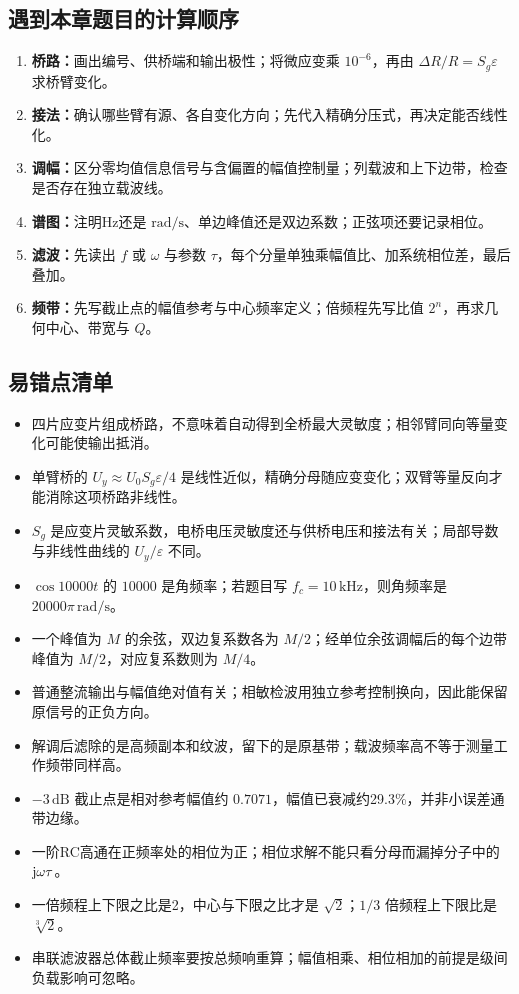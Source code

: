 \subsection*{遇到本章题目的计算顺序}
\begin{enumerate}
\setlength{\itemsep}{0pt}
\item \textbf{桥路：}画出编号、供桥端和输出极性；将微应变乘 $10^{-6}$，再由 $\Delta R/R=S_g\varepsilon$ 求桥臂变化。
\item \textbf{接法：}确认哪些臂有源、各自变化方向；先代入精确分压式，再决定能否线性化。
\item \textbf{调幅：}区分零均值信息信号与含偏置的幅值控制量；列载波和上下边带，检查是否存在独立载波线。
\item \textbf{谱图：}注明Hz还是 $\mathrm{rad/s}$、单边峰值还是双边系数；正弦项还要记录相位。
\item \textbf{滤波：}先读出 $f$ 或 $\omega$ 与参数 $\tau$，每个分量单独乘幅值比、加系统相位差，最后叠加。
\item \textbf{频带：}先写截止点的幅值参考与中心频率定义；倍频程先写比值 $2^n$，再求几何中心、带宽与 $Q$。
\end{enumerate}

\subsection*{易错点清单}
\begin{itemize}
\item 四片应变片组成桥路，不意味着自动得到全桥最大灵敏度；相邻臂同向等量变化可能使输出抵消。
\item 单臂桥的 $U_y\approx U_0S_g\varepsilon/4$ 是线性近似，精确分母随应变变化；双臂等量反向才能消除这项桥路非线性。
\item $S_g$ 是应变片灵敏系数，电桥电压灵敏度还与供桥电压和接法有关；局部导数与非线性曲线的 $U_y/\varepsilon$ 不同。
\item $\cos10000t$ 的 $10000$ 是角频率；若题目写 $f_c=10\,\mathrm{kHz}$，则角频率是 $20000\pi\,\mathrm{rad/s}$。
\item 一个峰值为 $M$ 的余弦，双边复系数各为 $M/2$；经单位余弦调幅后的每个边带峰值为 $M/2$，对应复系数则为 $M/4$。
\item 普通整流输出与幅值绝对值有关；相敏检波用独立参考控制换向，因此能保留原信号的正负方向。
\item 解调后滤除的是高频副本和纹波，留下的是原基带；载波频率高不等于测量工作频带同样高。
\item $-3\,\mathrm{dB}$ 截止点是相对参考幅值约 $0.7071$，幅值已衰减约29.3\%，并非小误差通带边缘。
\item 一阶RC高通在正频率处的相位为正；相位求解不能只看分母而漏掉分子中的 $\mathrm{j}\omega\tau$。
\item 一倍频程上下限之比是2，中心与下限之比才是 $\sqrt2$；$1/3$ 倍频程上下限比是 $\sqrt[3]2$。
\item 串联滤波器总体截止频率要按总频响重算；幅值相乘、相位相加的前提是级间负载影响可忽略。
\end{itemize}

